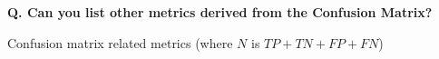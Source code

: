\begin{frame}[fragile]{\textbf{Q. Can you list other metrics derived from the Confusion Matrix?}}
  \begin{wideitemize}
  \item Confusion matrix related metrics (where $N$ is $TP + TN + FP + FN$)\\
    \begin{flushleft}
    \end{flushleft}

\end{wideitemize}
\end{frame}

